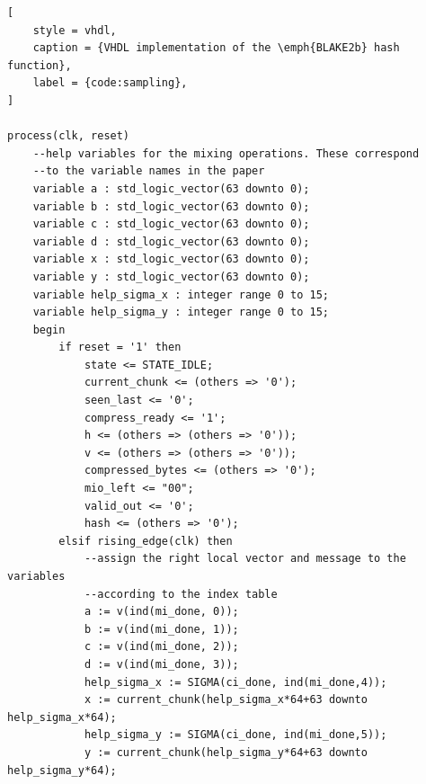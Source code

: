 \documentclass[%
	a4paper,
]
{article}
\begin{document}
\enlargethispage{-\baselineskip}
\begin{lstlisting}[
	style = vhdl,
	caption = {VHDL implementation of the \emph{BLAKE2b} hash function},
	label = {code:sampling},
]

process(clk, reset)
	--help variables for the mixing operations. These correspond
	--to the variable names in the paper
	variable a : std_logic_vector(63 downto 0);
	variable b : std_logic_vector(63 downto 0);
	variable c : std_logic_vector(63 downto 0);
	variable d : std_logic_vector(63 downto 0);
	variable x : std_logic_vector(63 downto 0);
	variable y : std_logic_vector(63 downto 0);
	variable help_sigma_x : integer range 0 to 15;
	variable help_sigma_y : integer range 0 to 15;
	begin
		if reset = '1' then
			state <= STATE_IDLE;
			current_chunk <= (others => '0');
			seen_last <= '0';
			compress_ready <= '1';
			h <= (others => (others => '0'));
			v <= (others => (others => '0'));
			compressed_bytes <= (others => '0');
			mio_left <= "00";
			valid_out <= '0';
			hash <= (others => '0');
		elsif rising_edge(clk) then
			--assign the right local vector and message to the variables
			--according to the index table
			a := v(ind(mi_done, 0));
			b := v(ind(mi_done, 1));
			c := v(ind(mi_done, 2));
			d := v(ind(mi_done, 3));
			help_sigma_x := SIGMA(ci_done, ind(mi_done,4));
			x := current_chunk(help_sigma_x*64+63 downto help_sigma_x*64);
			help_sigma_y := SIGMA(ci_done, ind(mi_done,5));
			y := current_chunk(help_sigma_y*64+63 downto help_sigma_y*64);


\end{lstlisting}
\end{document}
